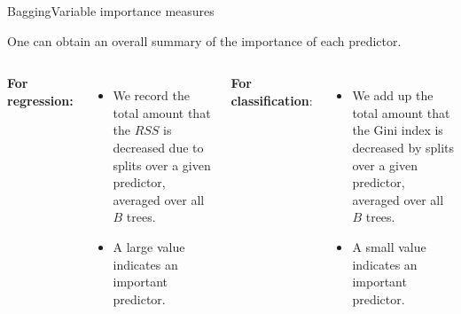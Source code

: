 \begin{frame}{Bagging}{Variable importance measures}

One can obtain an overall summary of the importance of each predictor.  \pause 

\begin{columns}[T]


        \textbf{For regression:} \\ \pause 
        \begin{itemize}

        \item We record the total amount that the $RSS$ is decreased due to splits over a given predictor, averaged over all $B$ trees. \pause 
        
        \item A large value indicates an important predictor. \pause 

        \end{itemize}
    
 



    \textbf{For classification}:\\ \pause 

    \begin{itemize}

    \item We add up the total amount that the Gini index is decreased by splits over a given predictor, averaged over all $B$ trees. \pause 

    \item A small value indicates an important predictor.

    \end{itemize}

 
    
\end{columns}

    
\end{frame}